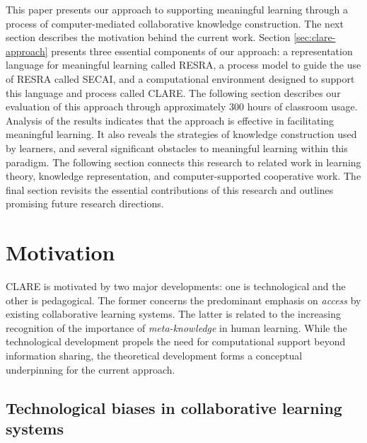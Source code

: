 This paper presents our approach to supporting meaningful learning through
a process of computer-mediated collaborative knowledge construction. The
next section describes the motivation behind the current work. Section
\ref{sec:clare-approach} presents three essential components of our
approach: a representation language for meaningful learning called RESRA, a
process model to guide the use of RESRA called SECAI, and a computational
environment designed to support this language and process called CLARE.
The following section describes our evaluation of this approach through
approximately 300 hours of classroom usage. Analysis of the results
indicates that the approach is effective in facilitating meaningful
learning. It also reveals the strategies of knowledge construction used by
learners, and several significant obstacles to meaningful learning within
this paradigm.  The following section connects this research to related
work in learning theory, knowledge representation, and computer-supported
cooperative work. The final section revisits the essential contributions of
this research and outlines promising future research directions.


\section{Motivation}
\label{sec:motivation}

CLARE is motivated by two major developments: one is technological and the
other is pedagogical. The former concerns the predominant emphasis on {\it
access\/} by existing collaborative learning systems. The latter is related
to the increasing recognition of the importance of {\it meta-knowledge\/}
in human learning. While the technological development propels the need for
computational support beyond information sharing, the theoretical
development forms a conceptual underpinning for the current approach.


\subsection{Technological biases in collaborative learning systems}

